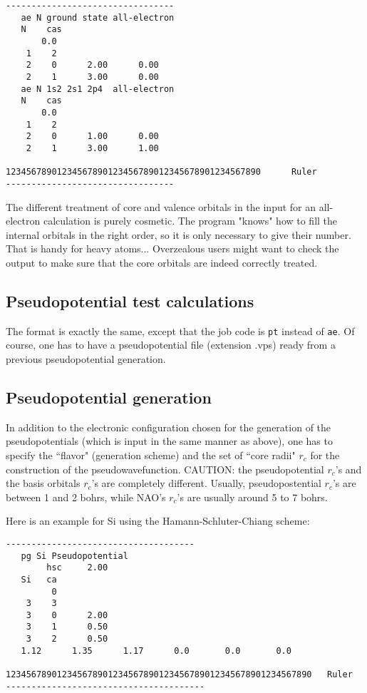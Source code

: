 \documentclass[11pt]{article}
\begin{document}
\begin{verbatim}
---------------------------------
   ae N ground state all-electron
   N    cas
       0.0
    1    2
    2    0      2.00      0.00
    2    1      3.00      0.00
   ae N 1s2 2s1 2p4  all-electron
   N    cas
       0.0
    1    2
    2    0      1.00      0.00
    2    1      3.00      1.00

12345678901234567890123456789012345678901234567890      Ruler
--------------------------------- 
\end{verbatim}
	
The different treatment of core and valence orbitals in the input for an
all-electron calculation is purely cosmetic. The program "knows" how
to fill the internal orbitals in the right order, so it is only
necessary to give their number. That is handy for heavy atoms...
Overzealous users might want to check the output to make sure that the
core orbitals are indeed correctly treated.


\subsection{Pseudopotential test calculations}

The format is exactly the same, except that the job code is {\tt pt}
instead of {\tt ae}. Of course, one has to have a pseudopotential file
(extension .vps) ready from a previous pseudopotential generation.


\subsection{Pseudopotential generation}

In addition to the electronic configuration chosen for the generation
of the pseudopotentials (which is input in the same manner as above),
one has to specify the ``flavor" (generation scheme) and the set of
``core radii" $r_c$ for the construction of the pseudowavefunction.
CAUTION: the pseudopotential $r_c$'s and the basis orbitals $r_c$'s
are completely different. Usually, pseudopostential $r_c$'s are
between 1 and 2 bohrs, while NAO's $r_c$'s are usually around 5 to 7
bohrs.

Here is an example for Si using the Hamann-Schluter-Chiang scheme:

\begin{verbatim}
-------------------------------------
   pg Si Pseudopotential
        hsc     2.00
   Si   ca
         0
    3    3
    3    0      2.00
    3    1      0.50
    3    2      0.50
   1.12      1.35      1.17      0.0       0.0       0.0

123456789012345678901234567890123456789012345678901234567890   Ruler
---------------------------------------
\end{verbatim}
\end{document}
